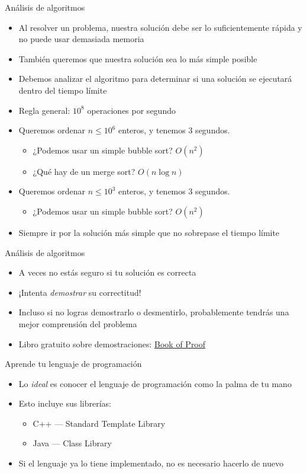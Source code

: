 \documentclass[10pt]{beamer}
\newcommand{\bi}{\begin{itemize}}
\newcommand{\ei}{\end{itemize}}
\begin{document}
\begin{frame}{Análisis de algoritmos}
    \bi
        \item Al resolver un problema, nuestra solución debe ser lo suficientemente rápida y no puede usar demasiada memoria
        \item También queremos que nuestra solución sea lo más simple posible
        \vspace{5pt}
        \item Debemos analizar el algoritmo para determinar si una solución se ejecutará dentro del tiempo límite
        \item Regla general: $10^{8}$ operaciones por segundo
        \vspace{10pt}
        \item<2-> Queremos ordenar $n \leq 10^{6}$ enteros, y tenemos 3 segundos.
            \bi
                \item ¿Podemos usar un simple bubble sort? $O(n^2)$
                \item ¿Qué hay de un merge sort? $O(n\log n)$
            \ei
        \vspace{5pt}
        \item<3-> Queremos ordenar $n \leq 10^{3}$ enteros, y tenemos 3 segundos.
            \bi
                \item ¿Podemos usar un simple bubble sort? $O(n^2)$
            \ei
        \vspace{5pt}
        \item<4-> Siempre ir por la solución más simple que no sobrepase el tiempo límite
    \ei
\end{frame}

\begin{frame}{Análisis de algoritmos}
    \bi
        \item A veces no estás seguro si tu solución es correcta
        \item ¡Intenta \textit{demostrar} su correctitud!
        \item Incluso si no logras demostrarlo o desmentirlo, probablemente tendrás una mejor comprensión del problema
        \vspace{20pt}
        \item Libro gratuito sobre demostraciones: \alert{\href{https://www.people.vcu.edu/~rhammack/BookOfProof/}{Book of Proof}}
    \ei
\end{frame}

\begin{frame}{Aprende tu lenguaje de programación}
    \bi
        \item Lo \textit{ideal} es conocer el lenguaje de programación como la palma de tu mano
        \item Esto incluye sus librerías:
            \bi
                \item C++ --- Standard Template Library
                \item Java --- Class Library
            \ei
        \item Si el lenguaje ya lo tiene implementado, no es necesario hacerlo de nuevo
    \ei
\end{frame}
\end{document}
